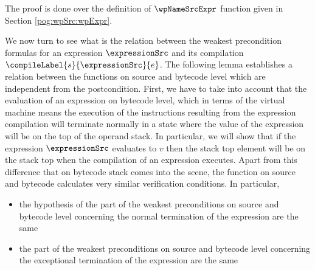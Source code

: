 The proof is done over the  definition of $\wpNameSrcExpr$ function given in Section \ref{pog:wpSrc:wpExpr}.



%


We now turn to see what is the relation between  the weakest precondition formulas for  an expression $\expressionSrc$ 
and its compilation $\compileLabel{s}{\expressionSrc}{e}$. 
The following lemma establishes a relation between the \wpName{} functions on source and bytecode level which 
are independent from the postcondition.
 First, we have to take into account that the evaluation 
of an expression on bytecode level, which in terms of the virtual machine means the execution of the instructions
resulting from the expression compilation will terminate normally in a state where the value of the expression will be on the top
of the operand stack. In particular, we will show that if  the expression  $\expressionSrc$ evaluates to $v$ then the stack top element will be on the stack top when 
the compilation of an expression executes.
 Apart from this difference that on bytecode stack comes into the scene, the \wpName{} function on source and bytecode 
calculates very similar verification conditions. In particular, 

\begin{itemize}
  \item the hypothesis of the part of the weakest preconditions on  source and bytecode level
concerning the normal termination of the expression  are the same  
   \item   the part of the weakest preconditions on  source and bytecode level concerning the exceptional termination 
           of the expression are the same  
\end{itemize}



